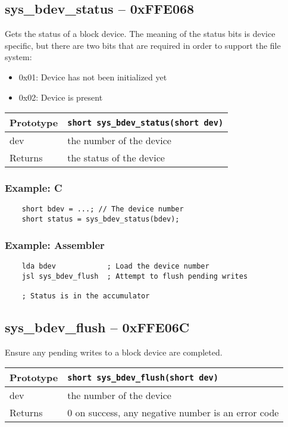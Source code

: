 \subsection*{sys\_bdev\_status -- 0xFFE068}
Gets the status of a block device. The meaning of the status bits is device specific, but there are two bits that are required in order to support the file system:
\begin{itemize}
    \item 0x01: Device has not been initialized yet
    \item 0x02: Device is present
\end{itemize}

\bigskip

\begin{tabular}{|l||l|} \hline
Prototype & \lstinline!short sys_bdev_status(short dev)! \\ \hline
dev & the number of the device \\ \hline
Returns & the status of the device \\ \hline
\end{tabular}

\subsubsection*{Example: C}
\begin{lstlisting}
    short bdev = ...; // The device number
    short status = sys_bdev_status(bdev);
\end{lstlisting}

\subsubsection*{Example: Assembler}
\begin{verbatim}
    lda bdev            ; Load the device number
    jsl sys_bdev_flush  ; Attempt to flush pending writes

    ; Status is in the accumulator
\end{verbatim}


\subsection*{sys\_bdev\_flush -- 0xFFE06C}
Ensure any pending writes to a block device are completed.

\bigskip

\begin{tabular}{|l||l|} \hline
Prototype & \lstinline!short sys_bdev_flush(short dev)! \\ \hline
dev & the number of the device \\ \hline
Returns & 0 on success, any negative number is an error code \\ \hline
\end{tabular}

